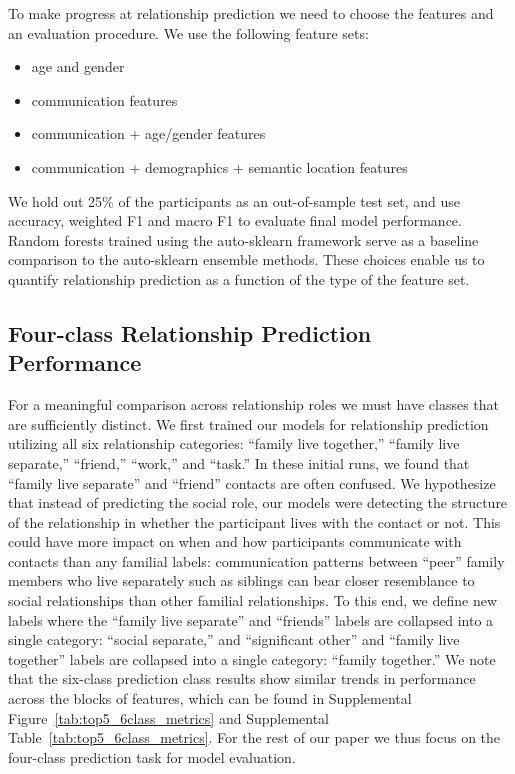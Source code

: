 \documentclass[acmlarge]{acmart}
\begin{document}
To make progress at relationship prediction we need to choose the features and an evaluation procedure. We use the following feature sets: 
\begin{itemize}
    \itemsep0em
    \item age and gender
    \item communication features
    \item communication + age/gender features 
    \item communication + demographics + semantic location features
\end{itemize}
We hold out 25\% of the participants as an out-of-sample test set, and use accuracy, weighted F1 and macro F1 to evaluate final model performance. Random forests trained using the auto-sklearn framework serve as a baseline comparison to the auto-sklearn ensemble methods. These choices enable us to quantify relationship prediction as a function of the type of the feature set.

\subsection{Four-class Relationship Prediction Performance}
For a meaningful comparison across relationship roles we must have classes that are sufficiently distinct. We first trained our models for relationship prediction utilizing all six relationship categories: ``family live together,'' ``family live separate,'' ``friend,'' ``work,'' and ``task.'' In these initial runs, we found that ``family live separate'' and ``friend'' contacts are often confused. We hypothesize that instead of predicting the social role, our models were detecting the structure of the relationship in whether the participant lives with the contact or not. This could have more impact on when and how participants communicate with contacts than any familial labels: communication patterns between ``peer'' family members who live separately such as siblings can bear closer resemblance to social relationships than other familial relationships. To this end, we define new labels where the  ``family live separate'' and ``friends'' labels are collapsed into a single category: ``social separate,'' and ``significant other'' and ``family live together'' labels are collapsed into a single category: ``family together.'' We note that the six-class prediction class results show similar trends in performance across the blocks of features, which can be found in Supplemental Figure~\ref{tab:top5_6class_metrics} and Supplemental Table~\ref{tab:top5_6class_metrics}. For the rest of our paper we thus focus on the four-class prediction task for model evaluation. 
\end{document}
